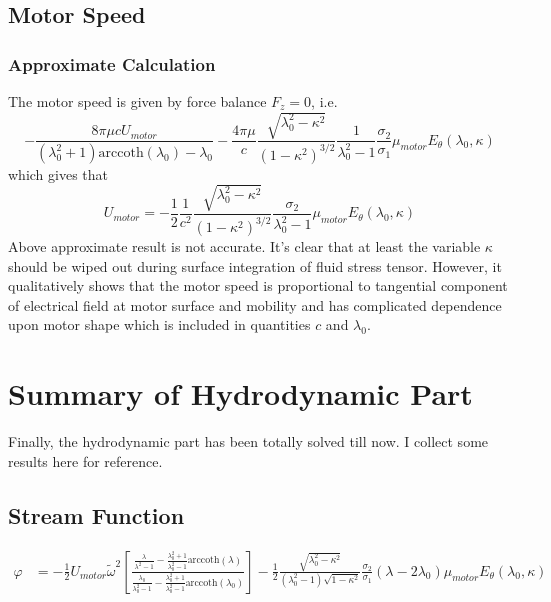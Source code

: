 \documentclass[fontsize=11pt, %
                             paper=a4, %
                             twoside, %
                             captions=tableheading,
                             index=totoc,
                             hyperref]{labbook}
\begin{document}
\subsection{Motor Speed}
\subsubsection{Approximate Calculation}
The motor speed is given by force balance $F_z=0$, i.e.
\begin{equation}
-\frac{8\pi\mu c U_{motor}}{(\lambda_0^2+1)\mathrm{arccoth}(\lambda_0)-\lambda_0}-\frac{4\pi\mu}{c}\frac{\sqrt{\lambda_0^2-\kappa^2}}{(1-\kappa^2)^{3/2}}\frac{1}{\lambda_0^2-1}\frac{\sigma_2}{\sigma_1}\mu_{motor}E_\theta(\lambda_0,\kappa)
\end{equation}
which gives that
\begin{equation}
U_{motor}=-\frac{1}{2}\frac{1}{c^2}\frac{\sqrt{\lambda_0^2-\kappa^2}}{(1-\kappa^2)^{3/2}}\frac{\sigma_2}{\lambda^2_0-1}\mu_{motor}E_\theta(\lambda_0,\kappa)
\end{equation}
Above approximate result is not accurate. It's clear that at least the variable $\kappa$ should be wiped out during surface integration of fluid stress tensor. However, it qualitatively shows that the motor speed is proportional to tangential component of electrical field at motor surface and mobility and has complicated dependence upon motor shape which is included in quantities $c$ and $\lambda_0$.
\section{Summary of Hydrodynamic Part}
Finally, the hydrodynamic part has been totally solved till now. I collect some results here for reference.
\subsection{Stream Function}
\begin{equation}
\begin{aligned}
\varphi&=-\frac{1}{2}U_{motor}\tilde{\omega}^2\left[\frac{\frac{\lambda}{\lambda^2-1}-\frac{\lambda_0^2+1}{\lambda_0^2-1}\mathrm{arccoth}(\lambda)}{\frac{\lambda_0}{\lambda_0^2-1}-\frac{\lambda_0^2+1}{\lambda_0^2-1}\mathrm{arccoth}(\lambda_0)}\right]-\frac{1}{2}\frac{\sqrt{\lambda_0^2-\kappa^2}}{(\lambda_0^2-1)\sqrt{1-\kappa^2}}\frac{\sigma_2}{\sigma_1}(\lambda-2\lambda_0)\mu_{motor}E_\theta(\lambda_0,\kappa)
\end{aligned}
\end{equation}
\end{document}
